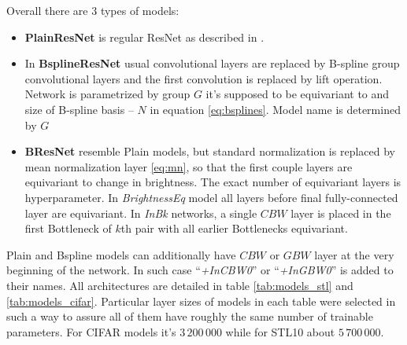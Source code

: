 Overall there are 3 types of models:
\begin{itemize}
    \item \textbf{PlainResNet} is regular ResNet as described in \cite{resnet}.
    \item In \textbf{BsplineResNet} usual convolutional layers are replaced by
        B-spline group convolutional layers and the first convolution is replaced
        by lift operation. Network is parametrized by group $G$ it's supposed to be
        equivariant to and size of B-spline basis -- $N$ in equation
        \ref{eq:bsplines}. Model name is determined by $G$
    \item \textbf{BResNet} resemble Plain models, but standard normalization is
        replaced by mean normalization layer \ref{eq:mn}, so that the first couple layers are
        equivariant to change in brightness. The exact number of equivariant
        layers is hyperparameter. In \textit{BrightnessEq} model all layers before
        final fully-connected layer are equivariant. In \textit{InBk} networks,
        a single $\mathit{CBW}$ layer is placed in the first Bottleneck of $k$th pair
        with all earlier Bottlenecks equivariant.
\end{itemize}
Plain and Bspline models can additionally have $\mathit{CBW}$ or $\mathit{GBW}$
layer at the very beginning of the network. In such case ``\textit{+InCBW0}'' or
``\textit{+InGBW0}'' is added to their names. All architectures are detailed in
table \ref{tab:models_stl} and \ref{tab:models_cifar}. Particular layer sizes of
models in each table were selected in such a way to assure all of them have
roughly the same number of trainable parameters. For CIFAR models it's
$3\,200\,000$ while for STL10 about $5\,700\,000$.

